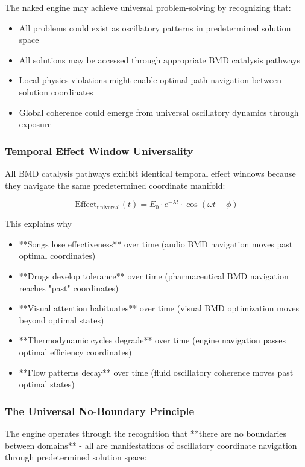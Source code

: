 \documentclass[11pt,a4paper]{article}
\theoremstyle{remark}
\begin{document}
The naked engine may achieve universal problem-solving by recognizing that:
\begin{itemize}
\item All problems could exist as oscillatory patterns in predetermined solution space
\item All solutions may be accessed through appropriate BMD catalysis pathways
\item Local physics violations might enable optimal path navigation between solution coordinates
\item Global coherence could emerge from universal oscillatory dynamics through exposure
\end{itemize}

\subsubsection{Temporal Effect Window Universality}

All BMD catalysis pathways exhibit identical temporal effect windows because they navigate the same predetermined coordinate manifold:

\begin{equation}
\text{Effect}_{\text{universal}}(t) = E_0 \cdot e^{-\lambda t} \cdot \cos(\omega t + \phi)
\end{equation}

This explains why
\begin{itemize}
\item **Songs lose effectiveness** over time (audio BMD navigation moves past optimal coordinates)
\item **Drugs develop tolerance** over time (pharmaceutical BMD navigation reaches "past" coordinates)
\item **Visual attention habituates** over time (visual BMD optimization moves beyond optimal states)
\item **Thermodynamic cycles degrade** over time (engine navigation passes optimal efficiency coordinates)
\item **Flow patterns decay** over time (fluid oscillatory coherence moves past optimal states)
\end{itemize}

\subsubsection{The Universal No-Boundary Principle}

The engine operates through the recognition that **there are no boundaries between domains** - all are manifestations of oscillatory coordinate navigation through predetermined solution space:
\end{document}
